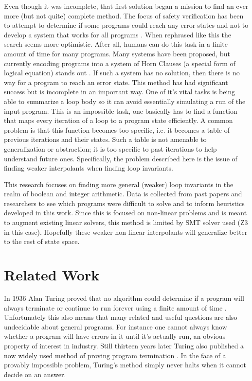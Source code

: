 \documentclass[letterpaper,twocolumn,10pt]{article}
\begin{document}
Even though it was incomplete, that first solution began a mission to find
an ever more (but not quite) complete method. The focus of safety verification
has been to ​attempt to determine if some programs could reach any error states
and not to develop a system that works for all programs \cite{program-termination}.
When rephrased like
this the search seems more optimistic. After all, humans can do this task in a
finite amount of time for many programs. Many systems have been proposed, but
currently encoding programs into a system of Horn Clauses (a special form of
logical equation) stands out \cite{solving-horn-inter}.
If such a system has no solution, then there
is no way for a program to reach an error state. This method has had significant
success but is incomplete in an important way. One of it’s vital tasks is being able
to summarize a loop body so it can avoid essentially simulating a run of the input
program. This is an impossible task, one basically has to find a function that maps
every iteration of a loop to a program state efficiently. A common problem is that
this function becomes too specific, i.e. it becomes a table of previous iterations
and their states. Such a table is not amenable to generalization or abstraction; it
is too specific to past iterations to help understand future ones. Specifically, the
problem described here is the issue of finding weaker interpolants when finding
loop invariants.


This research focuses on finding more general (weaker) loop invariants in
the realm of boolean and integer arithmetic.
Data is collected from past papers and researchers to see which programs were
difficult to solve and to inform heuristics developed in this work.
Since this is focused on non-linear problems and is meant to augment existing
linear solvers, this method is limited by SMT solver used (Z3 in this case).
Hopefully these weaker non-linear interpolants will generalize better to the
rest of state space.

\section{Related Work}

In 1936 Alan Turing proved that no algorithm could determine if a program will
always terminate or continue to run forever using a finite amount of time
\cite{turing}.
Unfortunately this also means that many related and useful questions are also
undecidable about general programs. For instance one cannot always know whether
a program will have errors in it until it’s actually run, an obvious property
of interest in industry. Still thirteen years later Turing also published a now
widely used method of proving program termination \cite{turing}.
In the face of a provably impossible problem, Turing’s method simply never halts
when it cannot decide on an answer.
\end{document}
